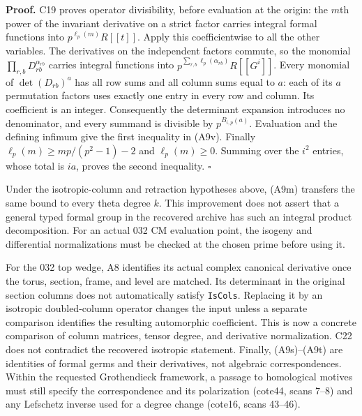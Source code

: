 \textbf{Proof.}
C19 proves operator divisibility, before evaluation at the
origin: the $m$th power of the invariant derivative on a strict
factor carries integral formal functions into
$p^{\ell_p(m)}R[[t]]$.  Apply this coefficientwise to all the
other variables.  The derivatives on the independent factors
commute, so the monomial $\prod_{r,b}D_{rb}^{\alpha_{rb}}$
carries integral functions into
$p^{\sum_{r,b}\ell_p(\alpha_{rb})}R[[G^i]]$.
Every monomial of $\det(D_{rb})^a$ has all row sums and all
column sums equal to $a$: each of its $a$ permutation factors
uses exactly one entry in every row and column.  Its coefficient
is an integer.  Consequently the determinant expansion introduces
no denominator, and every summand is divisible by
$p^{B_{i,p}(a)}$.  Evaluation and the defining infimum give
the first inequality in (A9v).  Finally
$\ell_p(m)\geq mp/(p^2-1)-2$ and $\ell_p(m)\geq0$.
Summing over the $i^2$ entries, whose total is $ia$, proves
the second inequality. \hfill$\square$

Under the isotropic-column and retraction hypotheses above,
(A9m) transfers the same bound to every theta degree $k$.
This improvement does not assert that a general typed formal
group in the recovered archive has such an integral product
decomposition.  For an actual 032 CM evaluation point, the
isogeny and differential normalizations must be checked at the
chosen prime before using it.

For the 032 top wedge, A8 identifies its actual complex
canonical derivative once the torus, section, frame, and
level are matched.  Its determinant in the original
section columns does not automatically satisfy
\texttt{IsCols}.  Replacing it by an isotropic doubled-column
operator changes the input unless a separate comparison
identifies the resulting automorphic coefficient.
This is now a concrete comparison of column matrices,
tensor degree, and derivative normalization.  C22 does
not contradict the recovered isotropic statement.
Finally, (A9s)--(A9t) are identities of formal germs and
their derivatives, not algebraic correspondences.
Within the requested Grothendieck framework, a passage
to homological motives must still specify the
correspondence and its polarization (cote44, scans 7--8)
and any Lefschetz inverse used for a degree change
(cote16, scans 43--46).
